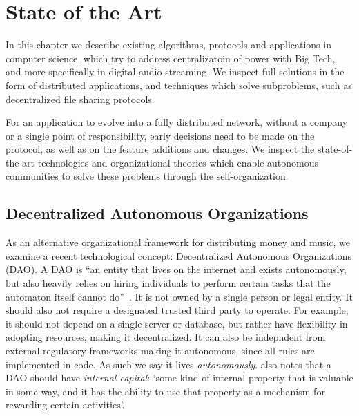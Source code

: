 \chapter{\label{chap:state-of-the-art}State of the Art}
In this chapter we describe existing algorithms, protocols and applications in computer science, which try to address %
centralizatoin of power with Big Tech, and more specifically in digital audio streaming. We inspect full solutions in the form of distributed applications, and techniques which solve subproblems, such as decentralized file sharing protocols.

For an application to evolve into a fully distributed network, without a company or a single point of responsibility, early decisions need to be made on the protocol, as well as on the feature additions and changes. We inspect the state-of-the-art technologies and organizational theories which enable autonomous communities to solve these problems through the self-organization.

\section{Decentralized Autonomous Organizations}
As an alternative organizational framework for distributing money and music, we examine a recent technological concept: Decentralized Autonomous Organizations (DAO).
A DAO is ``an entity that lives on the internet and exists autonomously, but also heavily relies on hiring individuals to perform certain tasks that the automaton itself cannot do''~\citep{buterin2014dao}. It is not owned by a single person or legal entity. It should also not require a designated trusted third party to operate. For example, it should not depend on a single server or database, but rather have flexibility in adopting resources, making it decentralized. It can also be indepndent from external regulatory frameworks making it autonomous, since all rules are implemented in code. 
As such we say it lives \textit{autonomously}. \cite{buterin2014dao} also notes that a DAO should have \textit{internal capital}: `some kind of internal property that is valuable in some way, and it has the ability to use that property as a mechanism for rewarding certain activities'. %




